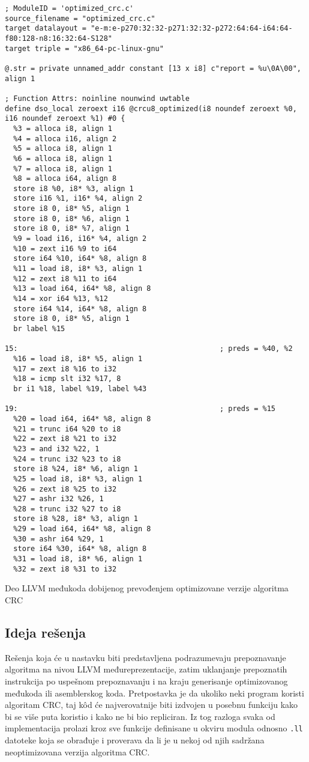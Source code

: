 \documentclass[12pt,oneside]{memoir}
\begin{document}
\begin{listing}
\begin{verbatim}
; ModuleID = 'optimized_crc.c'
source_filename = "optimized_crc.c"
target datalayout = "e-m:e-p270:32:32-p271:32:32-p272:64:64-i64:64-f80:128-n8:16:32:64-S128"
target triple = "x86_64-pc-linux-gnu"

@.str = private unnamed_addr constant [13 x i8] c"report = %u\0A\00", align 1

; Function Attrs: noinline nounwind uwtable
define dso_local zeroext i16 @crcu8_optimized(i8 noundef zeroext %0, i16 noundef zeroext %1) #0 {
  %3 = alloca i8, align 1
  %4 = alloca i16, align 2
  %5 = alloca i8, align 1
  %6 = alloca i8, align 1
  %7 = alloca i8, align 1
  %8 = alloca i64, align 8
  store i8 %0, i8* %3, align 1
  store i16 %1, i16* %4, align 2
  store i8 0, i8* %5, align 1
  store i8 0, i8* %6, align 1
  store i8 0, i8* %7, align 1
  %9 = load i16, i16* %4, align 2
  %10 = zext i16 %9 to i64
  store i64 %10, i64* %8, align 8
  %11 = load i8, i8* %3, align 1
  %12 = zext i8 %11 to i64
  %13 = load i64, i64* %8, align 8
  %14 = xor i64 %13, %12
  store i64 %14, i64* %8, align 8
  store i8 0, i8* %5, align 1
  br label %15

15:                                               ; preds = %40, %2
  %16 = load i8, i8* %5, align 1
  %17 = zext i8 %16 to i32
  %18 = icmp slt i32 %17, 8
  br i1 %18, label %19, label %43

19:                                               ; preds = %15
  %20 = load i64, i64* %8, align 8
  %21 = trunc i64 %20 to i8
  %22 = zext i8 %21 to i32
  %23 = and i32 %22, 1
  %24 = trunc i32 %23 to i8
  store i8 %24, i8* %6, align 1
  %25 = load i8, i8* %3, align 1
  %26 = zext i8 %25 to i32
  %27 = ashr i32 %26, 1
  %28 = trunc i32 %27 to i8
  store i8 %28, i8* %3, align 1
  %29 = load i64, i64* %8, align 8
  %30 = ashr i64 %29, 1
  store i64 %30, i64* %8, align 8
  %31 = load i8, i8* %6, align 1
  %32 = zext i8 %31 to i32
\end{verbatim}
\caption{Deo LLVM međukoda dobijenog prevođenjem optimizovane verzije algoritma CRC}
\label{syrmia_opt_crc_ir}
\centering
\end{listing}

\subsection{Ideja rešenja}

Rešenja koja će u nastavku biti predstavljena podrazumevaju prepoznavanje algoritma na nivou LLVM međureprezentacije, zatim uklanjanje prepoznatih instrukcija po uspešnom prepoznavanju i na kraju generisanje optimizovanog međukoda ili asemblerskog koda. Pretpostavka je da ukoliko neki program koristi algoritam CRC, taj k\^od će najverovatnije biti izdvojen u posebnu funkciju kako bi se više puta koristio i kako ne bi bio repliciran. Iz tog razloga svaka od implementacija prolazi kroz sve funkcije definisane u okviru modula odnosno \texttt{.ll} datoteke koja se obrađuje i proverava da li je u nekoj od njih sadržana neoptimizovana verzija algoritma CRC.
\end{document}
